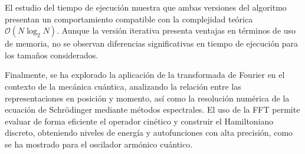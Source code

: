 \documentclass[11pt,a4paper,twoside,pdf]{article}
\numberwithin{equation}{section}
\begin{document}
El estudio del tiempo de ejecución muestra que ambas versiones del algoritmo presentan un comportamiento compatible con la complejidad teórica $\mathcal{O}(N\log_2 N)$. Aunque la versión iterativa presenta ventajas en términos de uso de memoria, no se observan diferencias significativas en tiempo de ejecución para los tamaños considerados.

Finalmente, se ha explorado la aplicación de la transformada de Fourier en el contexto de la mecánica cuántica, analizando la relación entre las representaciones en posición y momento, así como la resolución numérica de la ecuación de Schrödinger mediante métodos espectrales. El uso de la FFT permite evaluar de forma eficiente el operador cinético y construir el Hamiltoniano discreto, obteniendo niveles de energía y autofunciones con alta precisión, como se ha mostrado para el oscilador armónico cuántico.



\newpage


\end{document}
